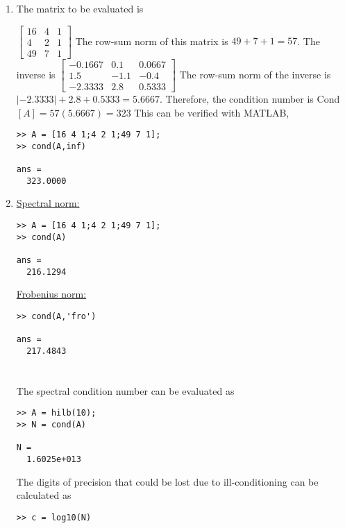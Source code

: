 \documentclass[../main.tex]{subfiles}
\begin{document}
\section{}
\begin{enumerate}[label=\bfseries(\alph*)]
\item The matrix to be evaluated is
\bigbreak

$\left[\begin{array}{ccc}
16 & 4 & 1 \\
4 & 2 & 1 \\
49 & 7 & 1
\end{array}\right]$
\bigbreak
The row-sum norm of this matrix is $49+7+1=57$. The inverse is
\bigbreak
$\left[\begin{array}{ccc}-0.1667 & 0.1 & 0.0667 \\ 1.5 & -1.1 & -0.4 \\ -2.3333 & 2.8 & 0.5333\end{array}\right]$
\bigbreak
The row-sum norm of the inverse is $|-2.3333|+2.8+0.5333=5.6667$. Therefore, the condition number is
\bigbreak
Cond $[A]=57(5.6667)=323$
\bigbreak
This can be verified with MATLAB,
\bigbreak
\begin{lstlisting}[numbers=none]
>> A = [16 4 1;4 2 1;49 7 1];
>> cond(A,inf)

ans =
  323.0000
\end{lstlisting}
\bigbreak
\item\underline{Spectral norm:}
\bigbreak
\begin{lstlisting}[numbers=none]
>> A = [16 4 1;4 2 1;49 7 1];
>> cond(A)

ans =
  216.1294 
\end{lstlisting}
\bigbreak
\underline{Frobenius norm:}
\bigbreak
\begin{lstlisting}[numbers=none]
>> cond(A,'fro')

ans =
  217.4843
\end{lstlisting}
\bigbreak


\section{}
The spectral condition number can be evaluated as
\bigbreak
\begin{lstlisting}[numbers=none]
>> A = hilb(10);
>> N = cond(A)

N =
  1.6025e+013
\end{lstlisting}
\bigbreak
The digits of precision that could be lost due to ill-conditioning can be calculated as
\bigbreak
\begin{lstlisting}[numbers=none]
>> c = log10(N)


\end{lstlisting}
\end{enumerate}
\end{document}
